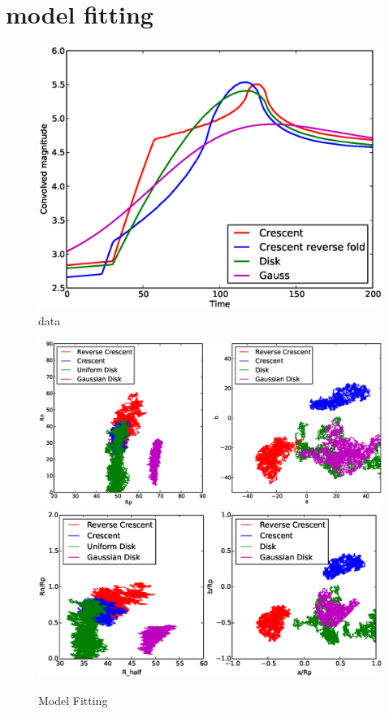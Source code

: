 \section{model fitting}

\begin{figure}
\centering
  \includegraphics[width=0.95\hsize]{plots/data.eps}
\caption{\label{fig:datafitting} data}
\end{figure}


\begin{figure}
\centering
  \includegraphics[width=0.95\hsize]{plots/image.eps}
  \includegraphics[width=0.95\hsize]{plots/image2.eps}
\caption{\label{fig:mcmc} Model Fitting}
\end{figure}


